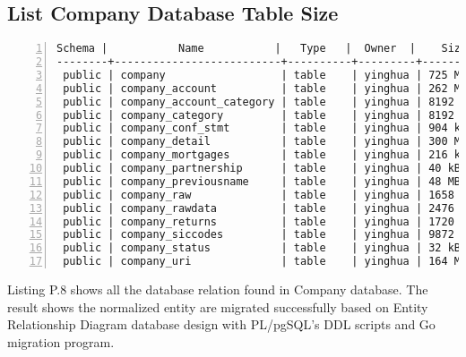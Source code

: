 \subsection{List Company Database Table Size}
\lstset{basicstyle=\ttfamily\tiny}  
\begin{lstlisting}[breaklines, frame=single, numbers=left, caption={List size of company normalized table.}, label=commandline-02]
 Schema |           Name           |   Type   |  Owner  |    Size    | Line counts  
--------+--------------------------+----------+---------+------------+-------------
 public | company                  | table    | yinghua | 725 MB     | 3595702
 public | company_account          | table    | yinghua | 262 MB     | 3595702
 public | company_account_category | table    | yinghua | 8192 bytes | 16
 public | company_category         | table    | yinghua | 8192 bytes | 21
 public | company_conf_stmt        | table    | yinghua | 904 kB     | 14900
 public | company_detail           | table    | yinghua | 300 MB     | 3595702
 public | company_mortgages        | table    | yinghua | 216 kB     | 3710
 public | company_partnership      | table    | yinghua | 40 kB      | 279
 public | company_previousname     | table    | yinghua | 48 MB      | 190185
 public | company_raw              | table    | yinghua | 1658 MB    | 3595702
 public | company_rawdata          | table    | yinghua | 2476 MB    | 3595702
 public | company_returns          | table    | yinghua | 1720 kB    | 28697
 public | company_siccodes         | table    | yinghua | 9872 kB    | 51693
 public | company_status           | table    | yinghua | 32 kB      | 14
 public | company_uri              | table    | yinghua | 164 MB     | 2033290

\end{lstlisting}

Listing P.8 shows all the database relation found in Company database. The result shows the normalized entity are migrated successfully based on Entity Relationship Diagram database design with PL/pgSQL's DDL scripts and Go migration program.

\newpage


